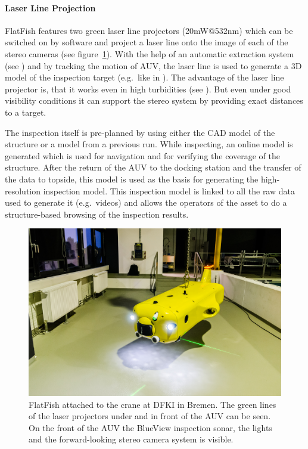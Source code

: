 \documentclass[conference]{IEEEtran}
\begin{document}
\paragraph*{\textbf{Laser Line Projection}} FlatFish features two green laser line projectors (20mW@532nm) which can be switched on by software and project a laser line 
onto the image of each of the stereo cameras (see figure~\ref{fig:flatfishlaser}). With the help 
of an automatic extraction system 
(see \cite{duda2013}) and by tracking the motion of AUV, the laser line is used to generate a 
3D model of the inspection target (e.g.~like in \cite{mcleod2013}). The advantage of the 
laser line projector is, that it works even in high turbidities (see \cite{albiez2015}). But even under
good visibility conditions it can support the stereo system by providing exact distances to a target.

The inspection itself is pre-planned by using either the CAD model of the structure or a 
model from a previous run. While inspecting, an online model is generated which is used for 
navigation and for verifying the coverage of the structure. After the return of the AUV to the 
docking station and the transfer of the data to topside, this model is used as the basis for 
generating the high-resolution inspection model. This inspection model is linked to all the raw 
data used to generate it (e.g.~videos) and allows the operators of the asset to do a structure-based browsing of the inspection results.

\begin{figure}[!t]
	\centering
	\includegraphics[width=0.9\columnwidth]{FlatFish-3.jpg}
	\caption{FlatFish attached to the crane at DFKI in Bremen. The green 
	lines of the laser projectors under and in front of the AUV can be seen. On the front of the AUV the 
	BlueView inspection sonar, the lights and the forward-looking stereo camera system is 
	visible.}
	\label{fig:flatfishlaser}
\end{figure}
\end{document}

